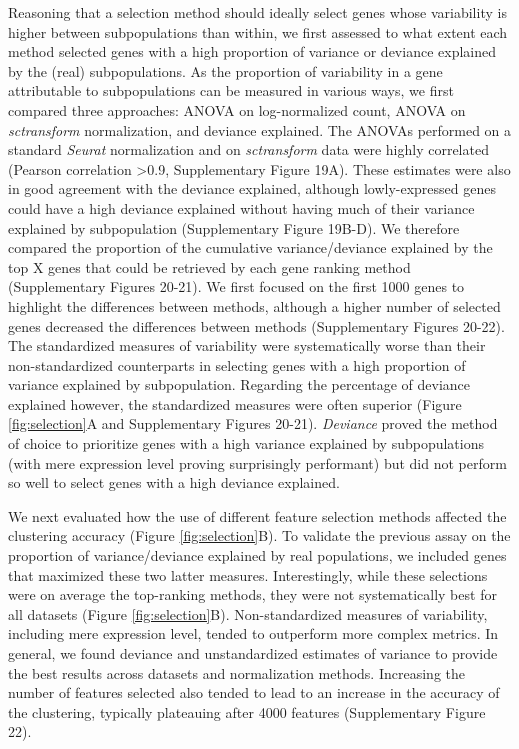 \documentclass[11pt]{article}
\begin{document}
Reasoning that a selection method should ideally select genes whose variability is higher between subpopulations than within, we first assessed to what extent each method selected genes with a high proportion of variance or deviance explained by the (real) subpopulations. As the proportion of variability in a gene attributable to subpopulations can be measured in various ways, we first compared three approaches: ANOVA on log-normalized count, ANOVA on \textit{sctransform} normalization, and deviance explained. The ANOVAs performed on a standard \textit{Seurat} normalization and on \textit{sctransform} data were highly correlated ({\color{red}Pearson correlation >0.9,} Supplementary Figure 19A). These estimates were also in good agreement with the deviance explained, although lowly-expressed genes could have a high deviance explained without having much of their variance explained by subpopulation (Supplementary Figure 19B-D). We therefore compared the proportion of the cumulative variance/deviance explained by the top X genes that could be retrieved by each gene ranking method (Supplementary Figures 20-21). We first focused on the first 1000 genes to highlight the differences between methods, although a higher number of selected genes decreased the differences between methods (Supplementary Figures 20-22). The standardized measures of variability were systematically worse than their non-standardized counterparts in selecting genes with a high proportion of variance explained by subpopulation. Regarding the percentage of deviance explained however, the standardized measures were often superior (Figure \ref{fig:selection}A and Supplementary Figures 20-21). \textit{Deviance} proved the method of choice to prioritize genes with a high variance explained by subpopulations (with mere expression level proving surprisingly performant) but did not perform so well to select genes with a high deviance explained.

We next evaluated how the use of different feature selection methods affected the clustering accuracy (Figure \ref{fig:selection}B). To validate the previous assay on the proportion of variance/deviance explained by real populations, we included genes that maximized these two latter measures. Interestingly, while these selections were on average the top-ranking methods, they were not systematically best for all datasets (Figure \ref{fig:selection}B). Non-standardized measures of variability, including mere expression level, tended to outperform more complex metrics. In general, we found deviance and unstandardized estimates of variance to provide the best results across datasets and normalization methods. Increasing the number of features selected also {\color{red}tended to lead} to an increase in the accuracy of the clustering, typically plateauing after 4000 features (Supplementary Figure 22).
\end{document}
